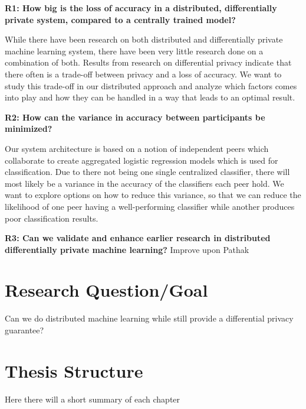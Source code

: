 \vspace{3mm}
\noindent\textbf{R1: How big is the loss of accuracy in a distributed, differentially private system, compared to a centrally trained model?}

\noindent While there have been research on both distributed and differentially private machine learning system, there have been very little research done on a combination of both. Results from research on differential privacy indicate that there often is a trade-off between privacy and a loss of accuracy. We want to study this trade-off in our distributed approach and analyze which factors comes into play and how they can be handled in a way that leads to an optimal result. 

\vspace{3mm}
\noindent
\textbf{R2: How can the variance in accuracy between participants be minimized?}

\noindent Our system architecture is based on a notion of independent peers which collaborate to create aggregated logistic regression models which is used for classification. Due to there not being one single centralized classifier, there will most likely be a variance in the accuracy of the classifiers each peer hold. We want to explore options on how to reduce this variance, so that we can reduce the likelihood of one peer having a well-performing classifier while another produces poor classification results. 

\vspace{3mm}
\noindent
\textbf{R3: Can we validate and enhance earlier research in distributed differentially private machine learning?}
Improve upon Pathak



\section{Research Question/Goal}
Can we do distributed machine learning while still provide a differential privacy guarantee?


\section{Thesis Structure}
Here there will a short summary of each chapter


